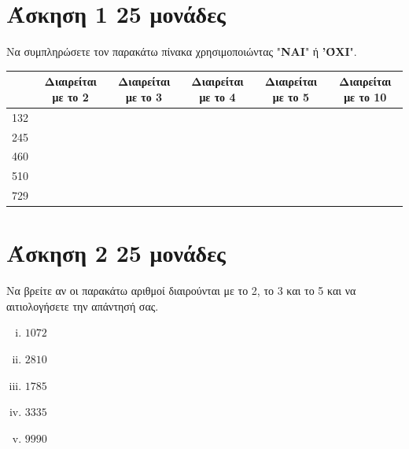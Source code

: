 \documentclass[a4paper,10pt]{report}
\begin{document}
\section*{Άσκηση 1  \hfill \small{25 μονάδες}}
Να συμπληρώσετε τον παρακάτω πίνακα χρησιμοποιώντας "\textbf{ΝΑΙ}" ή \textbf{'ΌΧΙ}".
\begin{center}
 \begin{tabular}{|c|c|c|c|c|c|}
\hline                   
        & \textbf{Διαιρείται με το 2}    & \textbf{Διαιρείται με το 3} & \textbf{Διαιρείται με το 4} &  \textbf{Διαιρείται με το 5}&\textbf{Διαιρείται με το 10}   \\
\hline 
132     &      &      &      &     &              \\
\hline
245     &      &      &      &     &     \\
\hline
460     &      &      &      &     &   \\
\hline
510     &      &     &       &     &  \\
\hline
729     &      &     &       &     &  \\
\hline
\end{tabular}
\end{center}





\section*{Άσκηση 2  \hfill \small{25 μονάδες}}
Να βρείτε αν οι παρακάτω αριθμοί διαιρούνται με το 2, το 3 και το 5 και να αιτιολογήσετε την απάντησή σας.
\begin{enumerate}[i)]
 \item $1072$
 \item $2810$
 \item $1785$
 \item $3335$
 \item $9990$
\end{enumerate}
\end{document}
